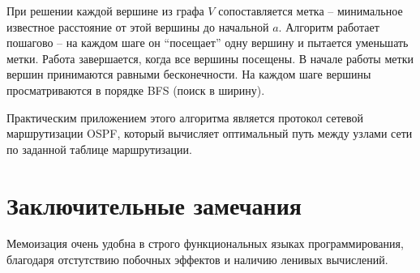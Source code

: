 \documentclass[11pt]{article}
\begin{document}
При решении каждой вершине из графа $V$ сопоставляется метка -- минимальное известное расстояние от этой вершины до начальной $a$. Алгоритм работает пошагово -- на каждом шаге он ``посещает'' одну вершину и пытается уменьшать метки. Работа завершается, когда все вершины посещены. В начале работы метки вершин принимаются равными бесконечности. На каждом шаге вершины просматриваются в порядке BFS (поиск в ширину).

Практическим приложением этого алгоритма является протокол сетевой маршрутизации OSPF, который вычисляет оптимальный путь между узлами сети по заданной таблице маршрутизации.

\section{Заключительные замечания}

Мемоизация очень удобна в строго функциональных языках программирования, благодаря отстутствию побочных эффектов и наличию ленивых вычислений.
\end{document}
